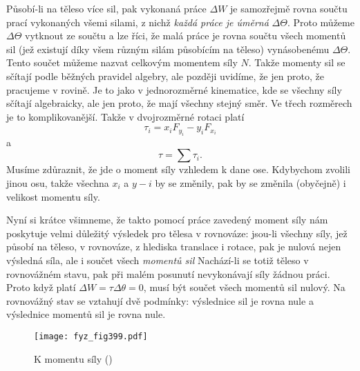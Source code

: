    Působí-li na těleso více sil, pak vykonaná práce \(\Delta W\) je samozřejmě rovna součtu prací
    vykonaných všemi silami, z nichž \emph{každá práce je úměrná} \(\Delta \varTheta\). Proto můžeme
    \(\Delta \varTheta\) vytknout ze součtu a lze říci, že malá práce je rovna součtu všech momentů
    sil (jež existují díky všem různým silám působícím na těleso) vynásobenému \(\Delta \varTheta\).
    Tento součet můžeme nazvat celkovým momentem síly \(N\). Takže momenty sil se sčítají podle
    běžných pravidel algebry, ale později uvidíme, že jen proto, že pracujeme v rovině. Je to jako v
    jednorozměrné kinematice, kde se všechny síly sčítají algebraicky, ale jen proto, že mají
    všechny stejný směr. Ve třech rozměrech je to komplikovanější. Takže v dvojrozměrné rotaci platí
    \begin{equation}\label{fyz:eq660}
      τ_i=x_iF_{y_i}−y_iF_{x_i}
    \end{equation}
    a 
    \begin{equation}\label{fyz:eq661}
      τ=∑τ_i.
    \end{equation}
    Musíme zdůraznit, že jde o moment síly vzhledem k dane ose. Kdybychom zvolili jinou osu, takže
    všechna \(x_i\) a \(y-i\) by se změnily, pak by se změnila (obyčejně) i velikost momentu síly.

    Nyní si krátce všimneme, že takto pomocí práce zavedený moment síly nám poskytuje velmi
    důležitý výsledek pro tělesa v rovnováze: jsou-li všechny síly, jež působí na těleso, v
    rovnováze, z hlediska translace i rotace, pak je nulová nejen výsledná síla, ale i součet všech
    \emph{momentů sil} Nachází-li se totiž těleso v rovnovážném stavu, pak při malém posunutí
    nevykonávají síly žádnou práci. Proto když platí \(ΔW=τΔθ=0\), musí být součet všech momentů sil
    nulový. Na rovnovážný stav se vztahují dvě podmínky: výslednice sil je rovna nule a výslednice
    momentů sil je rovna nule. 

    \begin{figure}[ht!] %
      \centering
      \texttt{[image: fyz\_fig399.pdf]}
      \caption{K momentu síly (\cite[s.~253]{Feynman01})}
      \label{fyz:fig399}
    \end{figure}

